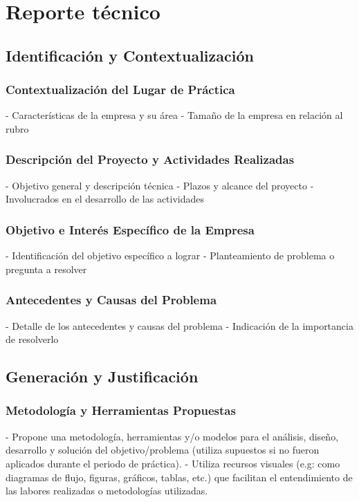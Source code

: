 \section{Reporte técnico}

\subsection{Identificación y Contextualización}
\subsubsection{Contextualización del Lugar de Práctica}
    - Características de la empresa y su área
    - Tamaño de la empresa en relación al rubro

\subsubsection{Descripción del Proyecto y Actividades Realizadas}
    - Objetivo general y descripción técnica
    - Plazos y alcance del proyecto
    - Involucrados en el desarrollo de las actividades

\subsubsection{Objetivo e Interés Específico de la Empresa}
    - Identificación del objetivo específico a lograr
    - Planteamiento de problema o pregunta a resolver

\subsubsection{Antecedentes y Causas del Problema}
    - Detalle de los antecedentes y causas del problema
    - Indicación de la importancia de resolverlo

\subsection{Generación y Justificación}

\subsubsection{Metodología y Herramientas Propuestas}
    - Propone una metodología, herramientas y/o modelos para el análisis, diseño, desarrollo y solución del objetivo/problema (utiliza supuestos si no fueron aplicados durante el periodo de práctica).
    - Utiliza recursos visuales (e.g: como diagramas de flujo, figuras, gráficos, tablas, etc.) que facilitan el entendimiento de las labores realizadas o metodologías utilizadas.

